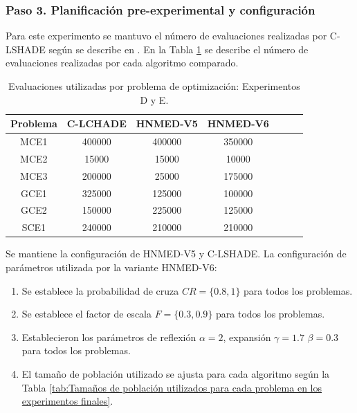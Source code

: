 \subsubsection{Paso 3. Planificación pre-experimental y configuración}
Para este experimento se mantuvo el número de evaluaciones realizadas por C-LSHADE según se describe en \cite{zapata_zapata_control_2017}. En la Tabla \ref{tab:Evaluaciones utilizadas por problema de optimización: Experimentos D y E.} se describe el número de evaluaciones realizadas por cada algoritmo comparado.

\begin{table}[hb]
	
	\caption{Evaluaciones utilizadas por problema de optimización: Experimentos D y E.}
	\label{tab:Evaluaciones utilizadas por problema de optimización: Experimentos D y E.}
	\centering
	
	\begin{tabular}{ccccccc}
		\textbf{Problema} &   C-LCHADE     &HNMED-V5&HNMED-V6 \\
		\hline
		MCE1   &   400000 &400000 &350000   \\
		MCE2   &   15000  &15000  &10000   \\
		MCE3   &   200000 &25000  &175000  \\
		GCE1   &   325000 &125000  &100000\\
		GCE2   &   150000 &225000  &125000\\
		SCE1   &   240000 &210000  &210000\\
	\end{tabular}
	
\end{table}
Se mantiene la configuración de HNMED-V5 y C-LSHADE. La configuración de parámetros utilizada por la variante HNMED-V6:
\begin{enumerate}
	\item Se establece la probabilidad de cruza $CR=\{0.8, 1\}$  para todos los problemas.
	\item Se establece el factor de escala $F=\{0.3, 0.9\}$ para todos los problemas.
	\item Establecieron los parámetros de reflexión $\alpha=2$, expansión $\gamma=1.7$ $\beta=0.3$ para todos los problemas.
	\item El tamaño de población utilizado se ajusta para cada algoritmo según la Tabla \ref{tab:Tamaños de población utilizados para cada problema en los experimentos finales}. 
\end{enumerate}

